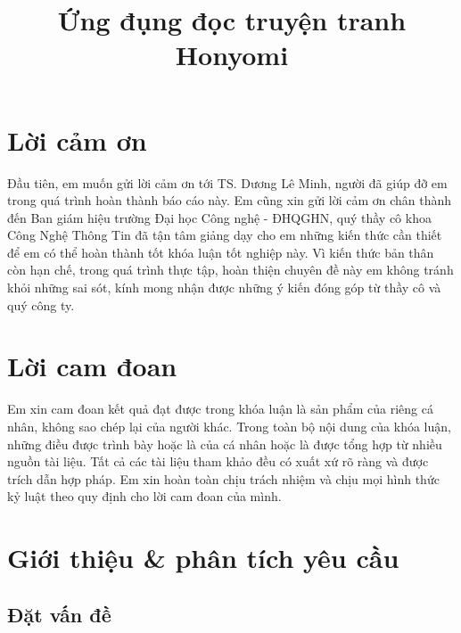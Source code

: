 \documentclass{report}
\title{Ứng đụng đọc truyện tranh Honyomi}
\begin{document}

\clearpage

\tableofcontents
\clearpage



% 
\chapter*{Lời cảm ơn}

Đầu tiên, em muốn gửi lời cảm ơn tới TS. Dương Lê Minh, người đã giúp đỡ em trong quá trình hoàn thành báo cáo này.
Em cũng xin gửi lời cảm ơn chân thành đến Ban giám hiệu trường Đại học Công nghệ - ĐHQGHN, quý thầy cô khoa Công Nghệ Thông Tin đã tận tâm giảng dạy cho em những kiến thức cần thiết để em có thể hoàn thành tốt khóa luận tốt nghiệp này.
Vì kiến thức bản thân còn hạn chế, trong quá trình thực tập, hoàn thiện chuyên đề này em không tránh khỏi những sai sót, kính mong nhận được những ý kiến đóng góp từ thầy cô và quý công ty.

\chapter*{Lời cam đoan}

Em xin cam đoan kết quả đạt được trong khóa luận là sản phẩm của riêng cá nhân, không sao chép lại của người khác. Trong toàn bộ nội dung của khóa luận, những điều được trình bày hoặc là của cá nhân hoặc là được tổng hợp từ nhiều nguồn tài liệu. Tất cả các tài liệu tham khảo đều có xuất xứ rõ ràng và được trích dẫn hợp pháp. Em xin hoàn toàn chịu trách nhiệm và chịu mọi hình thức kỷ luật theo quy định cho lời cam đoan của mình.

\listoffigures{}

\listoftables{}

\chapter{Giới thiệu \& phân tích yêu cầu}
\section{Đặt vấn đề}

\end{document}
